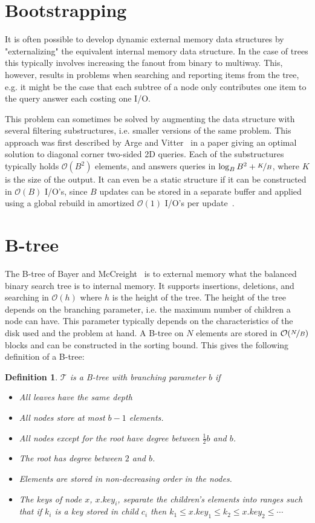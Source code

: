 \documentclass[twoside,11pt,openright]{report}
\newtheorem{definition}{Definition}
\begin{document}
\section{Bootstrapping}
It is often possible to develop dynamic external memory data structures by "externalizing" the equivalent internal memory data structure. In the case of trees this typically involves increasing the fanout from binary to multiway. This, however, results in problems when searching and reporting items from the tree, e.g. it might be the case that each subtree of a node only contributes one item to the query answer each costing one I/O.

This problem can sometimes be solved by augmenting the data structure with several filtering substructures, i.e. smaller versions of the same problem. This approach was first described by Arge and Vitter~\cite{arge_vitter_2003} in a paper giving an optimal solution to diagonal corner two-sided 2D queries. Each of the substructures typically holds $\mathcal{O}(B^2)$ elements, and answers queries in $\log_B B^2 + \nicefrac{K}{B}$, where $K$ is the size of the output. It can even be a static structure if it can be constructed in $\mathcal{O}(B)$ I/O's, since $B$ updates can be stored in a separate buffer and applied using a global rebuild in amortized $\mathcal{O}(1)$ I/O's per update~\cite{vitter_2008}.

\section{B-tree}
\label{sec:prelim_b_tree}
The B-tree of Bayer and McCreight~\cite{bayer_mccreight_1972} is to external memory what the balanced binary search tree is to internal memory. It supports insertions, deletions, and searching in $\mathcal{O}(h)$ where $h$ is the height of the tree. The height of the tree depends on the branching parameter, i.e. the maximum number of children a node can have. This parameter typically depends on the characteristics of the disk used and the problem at hand. A B-tree on $N$ elements are stored in $\mathcal{O}(\nicefrac{N}{B})$ blocks and can be constructed in the sorting bound.
This gives the following definition of a B-tree:

\begin{definition}
\label{def:btree}
$\mathcal{T}$ is a B-tree with branching parameter $b$ if
\begin{itemize}
	\item All leaves have the same depth
	\item All nodes store at most $b-1$ elements.
	\item All nodes except for the root have degree between $\frac{1}{2}b$ and $b$.
	\item The root has degree between $2$ and $b$.
	\item Elements are stored in non-decreasing order in the nodes.
	\item The keys of node $x$, $x.key_i$, separate the children's elements into ranges such that if $k_i$ is a key stored in child $c_i$ then $k_1 \leq x.key_1 \leq k_2 \leq x.key_2 \leq \cdots$
\end{itemize}
\end{definition}
\end{document}
